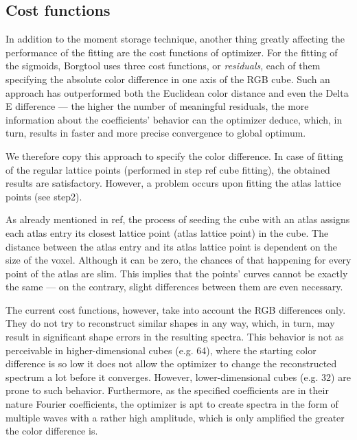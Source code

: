 \subsection{Cost functions} \label{ssec:costFunctions}

In addition to the moment storage technique, another thing greatly affecting the performance of the fitting are the cost functions of optimizer. For the fitting of the sigmoids, Borgtool uses three cost functions, or \emph{residuals}, each of them specifying the absolute color difference in one axis of the RGB cube. Such an approach has outperformed both the Euclidean color distance and even the Delta E difference --- the higher the number of meaningful residuals, the more information about the coefficients' behavior can the optimizer deduce, which, in turn, results in faster and more precise convergence to global optimum.

We therefore copy this approach to specify the color difference. In case of fitting of the regular lattice points (performed in step ref cube fitting), the obtained results are satisfactory. However, a problem occurs upon fitting the atlas lattice points (see step2).

As already mentioned in ref, the process of seeding the cube with an atlas assigns each atlas entry its closest lattice point (atlas lattice point) in the cube. The distance between the atlas entry and its atlas lattice point is dependent on the size of the voxel. Although it can be zero, the chances of that happening for every point of the atlas are slim. This implies that the points' curves cannot be exactly the same --- on the contrary, slight differences between them are even necessary.

The current cost functions, however, take into account the RGB differences only. They do not try to reconstruct similar shapes in any way, which, in turn, may result in significant shape errors in the resulting spectra. This behavior is not as perceivable in higher-dimensional cubes (e.g. 64), where the starting color difference is so low it does not allow the optimizer to change the reconstructed spectrum a lot before it converges. However, lower-dimensional cubes (e.g. 32) are prone to such behavior. Furthermore, as the specified coefficients are in their nature Fourier coefficients, the optimizer is apt to create spectra in the form of multiple waves with a rather high amplitude, which is only amplified the greater the color difference is.

